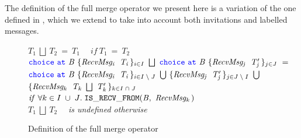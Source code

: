 \documentclass[12pt,twoside]{report}
\begin{document}
The definition of the full merge operator we present here is a variation of the one defined in \cite{featherweight}, which we extend to take into account both invitations and labelled messages.\\

\begin{figure}[h]

    \centering

    $\mathit{T_1}\ \bigsqcup\ \mathit{T_2}\ =\ \mathit{T_1} \quad \; \mathit{if}\ \mathit{T_1}\ =\ \mathit{T_2}$\\[17pt]

    $\choice\ \at\ \mathit{B}\ \{\mathit{RecvMsg_i}\ \;\mathit{T_i}\,\}_\varinset{i}{I}\ \bigsqcup\ \choice\ \at\ \mathit{B}\ \{\mathit{RecvMsg_j}\ \;\mathit{T'_j}\,\}_\varinset{j}{J}\ =$\\[5pt]
    $\choice\ \at\ \mathit{B}\ \{\mathit{RecvMsg_i}\ \;\mathit{T_i}\,\}_\varinset{i}{I\;\setminus\;J}\ \bigcup\ \{\mathit{RecvMsg_j}\ \;\mathit{T'_j}\,\}_\varinset{j}{J\;\setminus\;I}\ \bigcup$\\
     $\{\mathit{RecvMsg_k}\;\ \mathit{T_k}\ \bigsqcup\ \mathit{T'_k}\,\}_\varinset{k}{I\;\cap\;J}$\\[7.5pt]


    $\mathit{if}\ \forall \varinset{k}{I\;\cup\;J}.\;\mathtt{IS\_RECV\_FROM}(\mathit{B},\ \mathit{RecvMsg_k\,})$\\[14pt]




     $\mathit{T_1}\ \bigsqcup\ \mathit{T_2}$ \ \ \textit{is undefined otherwise}\\[7.5pt]

    \caption{Definition of the full merge operator}
    \label{fullmerge}
\end{figure}
\end{document}

